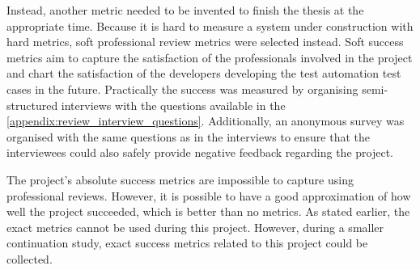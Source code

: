 Instead, another metric needed to be invented to finish the thesis at the appropriate time. Because it is hard to measure a system under construction with hard metrics, soft professional review metrics were selected instead. Soft success metrics aim to capture the satisfaction of the professionals involved in the project and chart the satisfaction of the developers developing the test automation test cases in the future. Practically the success was measured by organising semi-structured interviews with the questions available in the \autoref{appendix:review_interview_questions}. Additionally, an anonymous survey was organised with the same questions as in the interviews to ensure that the interviewees could also safely provide negative feedback regarding the project.

The project's absolute success metrics are impossible to capture using professional reviews. However, it is possible to have a good approximation of how well the project succeeded, which is better than no metrics. As stated earlier, the exact metrics cannot be used during this project. However, during a smaller continuation study, exact success metrics related to this project could be collected.